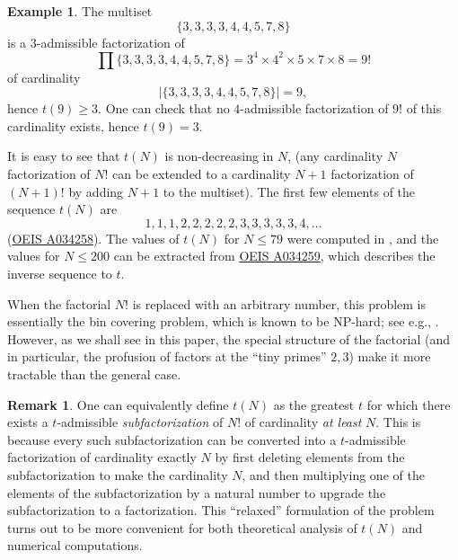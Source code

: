 \documentclass[12pt,a4paper,reqno]{amsart}
\numberwithin{equation}{section}
\theoremstyle{plain}
\theoremstyle{definition}
\newtheorem{remark}[theorem]{Remark}
\newtheorem{example}[theorem]{Example}
\begin{document}
\begin{example}\label{nine}  The multiset
  $$ \{ 3,3,3,3,4,4,5,7,8\}$$
  is a $3$-admissible factorization of 
$$ \prod \{ 3,3,3,3,4,4,5,7,8\} = 3^4 \times 4^2 \times 5 \times 7 \times 8 = 9!$$
of cardinality 
$$|\{ 3,3,3,3,4,4,5,7,8\}| = 9,$$
 hence $t(9) \geq 3$.  One can check that no $4$-admissible factorization of $9!$ of this cardinality exists, hence $t(9) = 3$.
\end{example}

It is easy to see that $t(N)$ is non-decreasing in $N$, (any cardinality $N$ factorization of $N!$ can be extended to a cardinality $N+1$ factorization of $(N+1)!$ by adding $N+1$ to the multiset).  The first few elements of the sequence $t(N)$ are
$$ 1,1,1,2,2,2,2,2,3,3,3,3,3,4, \dots$$
(\href{https://oeis.org/A034258}{OEIS A034258}). The values of $t(N)$ for $N \leq 79$ were computed in \cite{guy}, and the values for $N \leq 200$ can be extracted from \href{https://oeis.org/A034259}{OEIS A034259}, which describes the inverse sequence to $t$.

When the factorial $N!$ is replaced with an arbitrary number, this problem is essentially the bin covering problem, which is known to be NP-hard; see e.g., \cite{bincover}.  However, as we shall see in this paper, the special structure of the factorial (and in particular, the profusion of factors at the ``tiny primes'' $2,3$) make it more tractable than the general case.

\begin{remark}\label{subfac}  One can equivalently define $t(N)$ as the greatest $t$ for which there exists a $t$-admissible \emph{subfactorization} of $N!$ of cardinality \emph{at least} $N$.  This is because every such subfactorization can be converted into a $t$-admissible factorization of cardinality exactly $N$ by first deleting elements from the subfactorization to make the cardinality $N$, and then multiplying one of the elements of the subfactorization by a natural number to upgrade the subfactorization to a factorization.  This ``relaxed'' formulation of the problem turns out to be more convenient for both theoretical analysis of $t(N)$ and numerical computations.
\end{remark}
\end{document}
